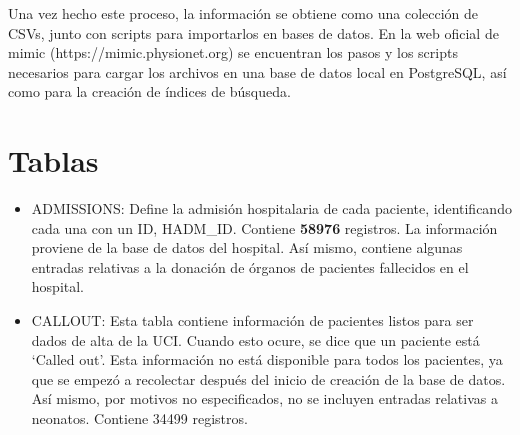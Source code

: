 \documentclass{report}
\begin{document}
Una vez hecho este proceso, la información se obtiene como una colección de CSVs, junto con scripts para importarlos en bases de datos. En la web oficial de mimic (https://mimic.physionet.org) se encuentran los pasos y los scripts necesarios para cargar los archivos en una base de datos local en PostgreSQL, así como para la creación de índices de búsqueda. 

\section{Tablas}

\begin{itemize}
\item
  ADMISSIONS: Define la admisión hospitalaria de cada paciente,
  identificando cada una con un ID, HADM\_ID. Contiene \textbf{58976}
  registros. La información proviene de la base de datos del hospital.
  Así mismo, contiene algunas entradas relativas a la donación de
  órganos de pacientes fallecidos en el hospital.
\item
  CALLOUT: Esta tabla contiene información de pacientes listos para ser
  dados de alta de la UCI. Cuando esto ocure, se dice que un paciente
  está `Called out'. Esta información no está disponible para todos los
  pacientes, ya que se empezó a recolectar después del inicio de
  creación de la base de datos. Así mismo, por motivos no especificados,
  no se incluyen entradas relativas a neonatos. Contiene 34499
  registros.


\end{itemize}
\end{document}
